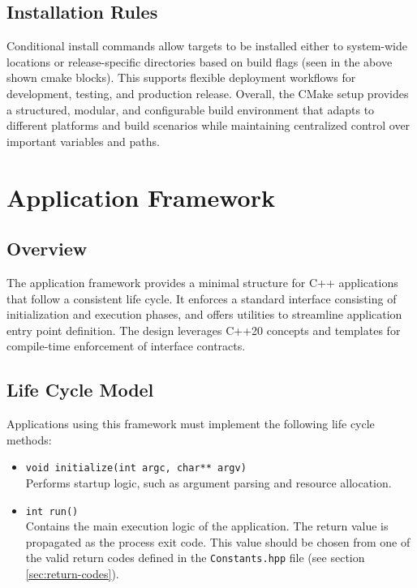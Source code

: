 \subsection{Installation Rules}

Conditional install commands allow targets to be installed either to system-wide locations or release-specific directories based on build flags (seen in the above shown cmake blocks). This supports flexible deployment workflows for development, testing, and production release. Overall, the CMake setup provides a structured, modular, and configurable build environment that adapts to different platforms and build scenarios while maintaining centralized control over important variables and paths.


















\section{Application Framework}
\label{sec:app-framework}

\subsection*{Overview}
The application framework provides a minimal structure for C++ applications that follow a consistent life cycle. It enforces a standard interface consisting of initialization and execution phases, and offers utilities to streamline application entry point definition. The design leverages C++20 concepts and templates for compile-time enforcement of interface contracts.

\subsection*{Life Cycle Model}
Applications using this framework must implement the following life cycle methods:
\begin{itemize}\itemsep0em
	\item \texttt{void initialize(int argc, char** argv)} \\
	Performs startup logic, such as argument parsing and resource allocation.
	\item \texttt{int run()} \\
	Contains the main execution logic of the application. The return value is propagated as the process exit code. This value should be chosen from one of the valid return codes defined in the \texttt{Constants.hpp} file (see section \ref{sec:return-codes}).
\end{itemize}

